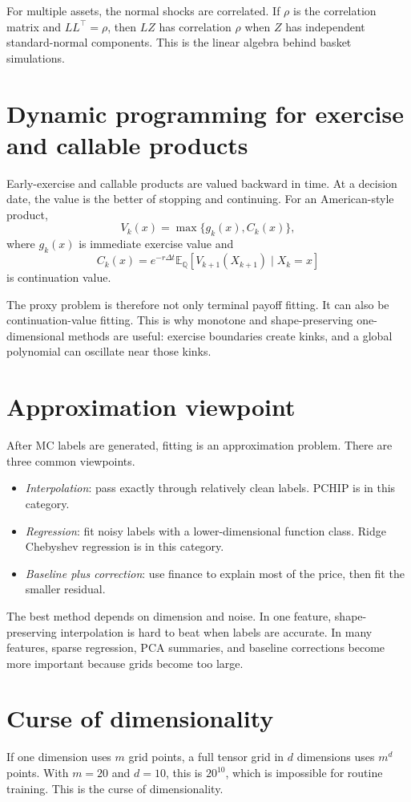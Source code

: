 \documentclass[11pt,oneside]{book}
\theoremstyle{definition}
\newcommand{\E}{\mathbb{E}}
\newcommand{\Q}{\mathbb{Q}}
\begin{document}
For multiple assets, the normal shocks are correlated. If \(\rho\) is the correlation matrix and \(L L^\top=\rho\), then \(LZ\) has correlation \(\rho\) when \(Z\) has independent standard-normal components. This is the linear algebra behind basket simulations.

\section{Dynamic programming for exercise and callable products}
Early-exercise and callable products are valued backward in time. At a decision date, the value is the better of stopping and continuing. For an American-style product,
\[
  V_k(x)=\max\{g_k(x), C_k(x)\},
\]
where \(g_k(x)\) is immediate exercise value and
\[
  C_k(x)=e^{-r\Delta t}\E_\Q[V_{k+1}(X_{k+1})\mid X_k=x]
\]
is continuation value.

The proxy problem is therefore not only terminal payoff fitting. It can also be continuation-value fitting. This is why monotone and shape-preserving one-dimensional methods are useful: exercise boundaries create kinks, and a global polynomial can oscillate near those kinks.

\section{Approximation viewpoint}
After MC labels are generated, fitting is an approximation problem. There are three common viewpoints.
\begin{itemize}
  \item \emph{Interpolation}: pass exactly through relatively clean labels. PCHIP is in this category.
  \item \emph{Regression}: fit noisy labels with a lower-dimensional function class. Ridge Chebyshev regression is in this category.
  \item \emph{Baseline plus correction}: use finance to explain most of the price, then fit the smaller residual.
\end{itemize}
The best method depends on dimension and noise. In one feature, shape-preserving interpolation is hard to beat when labels are accurate. In many features, sparse regression, PCA summaries, and baseline corrections become more important because grids become too large.

\section{Curse of dimensionality}
If one dimension uses \(m\) grid points, a full tensor grid in \(d\) dimensions uses \(m^d\) points. With \(m=20\) and \(d=10\), this is \(20^{10}\), which is impossible for routine training. This is the curse of dimensionality.
\end{document}
